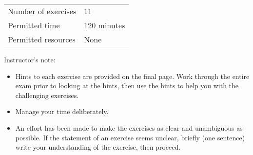 \begin{center}
\begin{tabular}{l@{ : }l}
Number of exercises	&	11			\\
Permitted time		&	120 minutes	\\
Permitted resources	&	None
\end{tabular}
\end{center}
\vspace{.25in}
\noindent{}Instructor's note:
\begin{itemize}
\item Hints to each exercise are provided on the final page. Work through the entire exam prior to looking at the hints, then use the hints to help you with the challenging exercises.
\item Manage your time deliberately.
\item An effort has been made to make the exercises as clear and unambiguous as possible. If the statement of an exercise seems unclear, briefly (one sentence) write your understanding of the exercise, then proceed.
\end{itemize}